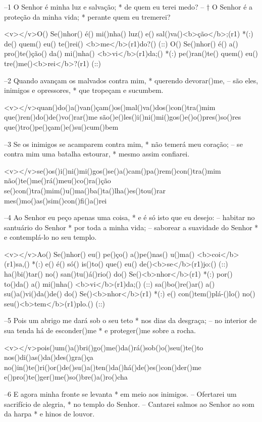 –1 O Senhor é minha luz e salvação; *
de quem eu terei medo?
– † O Senhor é a proteção da minha vida; *
perante quem eu tremerei?

<v></v>O() Se()nhor() é() mi()nha() luz() e() sal()va()<b>ção</b>;(r1) *(:)
de() quem() eu() te()rei() <b>me</b>(r1)do?() (::)
O() Se()nhor() é() a() pro()te()ção() da() mi()nha() <b>vi</b>(r1)da;() *(:)
pe()ran()te() quem() eu() tre()me()<b>rei</b>?(r1) (::)

–2 Quando avançam os malvados contra mim, *
querendo devorar()me,
– são eles, inimigos e opressores, *
que tropeçam e sucumbem.

<v></v>quan()do()a()van()çam()os()mal()va()dos()con()tra()mim
que()ren()do()de()vo()rar()me
são()e()les()i()ni()mi()gos()e()o()pres()so()res
que()tro()pe()çam()e()su()cum()bem

–3 Se os inimigos se acamparem contra mim, *
não temerá meu coração;
– se contra mim uma batalha estourar, *
mesmo assim confiarei.

<v></v>se()os()i()ni()mi()gos()se()a()cam()pa()rem()con()tra()mim
não()te()me()rá()meu()co()ra()ção
se()con()tra()mim()u()ma()ba()ta()lha()es()tou()rar
mes()mo()as()sim()con()fi()a()rei

–4 Ao Senhor eu peço apenas uma coisa, *
e é só isto que eu desejo:
– habitar no santuário do Senhor *
por toda a minha vida;
– saborear a suavidade do Senhor *
e contemplá-lo no seu templo.

<v></v>Ao() Se()nhor() eu() pe()ço() a()pe()nas() u()ma() <b>coi</b>(r1)sa,() *(:)
e() é() só() is()to() que() eu() de()<b>se</b>(r1)jo:() (::)
ha()bi()tar() no() san()tu()á()rio() do() Se()<b>nhor</b>(r1) *(:)
por() to()da() a() mi()nha() <b>vi</b>(r1)da;() (::)
sa()bo()re()ar() a() su()a()vi()da()de() do() Se()<b>nhor</b>(r1) *(:)
e() con()tem()plá-()lo() no() seu()<b>tem</b>(r1)plo.() (::)

–5 Pois um abrigo me dará sob o seu teto *
nos dias da desgraça;
– no interior de sua tenda há de esconder()me *
e proteger()me sobre a rocha.

<v>\VSup{}</v>pois()um()a()bri()go()me()da()rá()sob()o()seu()te()to
nos()di()as()da()des()gra()ça
no()in()te()ri()or()de()su()a()ten()da()há()de()es()con()der()me
e()pro()te()ger()me()so()bre()a()ro()cha

–6 E agora minha fronte se levanta *
em meio aos inimigos.
– Ofertarei um sacrifício de alegria, *
no templo do Senhor.
– Cantarei salmos ao Senhor ao som da harpa *
e hinos de louvor.

